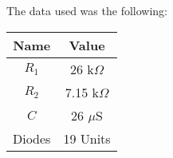 The data used was the following:

\begin{center}
  \begin{tabular}{ | c | c | }
    \hline    
    {\bf Name} & {\bf Value} \\ \hline
    $R_1$ & 26 k$\Omega$ \\ \hline 
    $R_2$ & 7.15 k$\Omega$ \\ \hline 
    $C$ & 26 $\mu$S \\ \hline
    Diodes & 19 Units \\ 
    \hline
  \end{tabular}
\end{center}